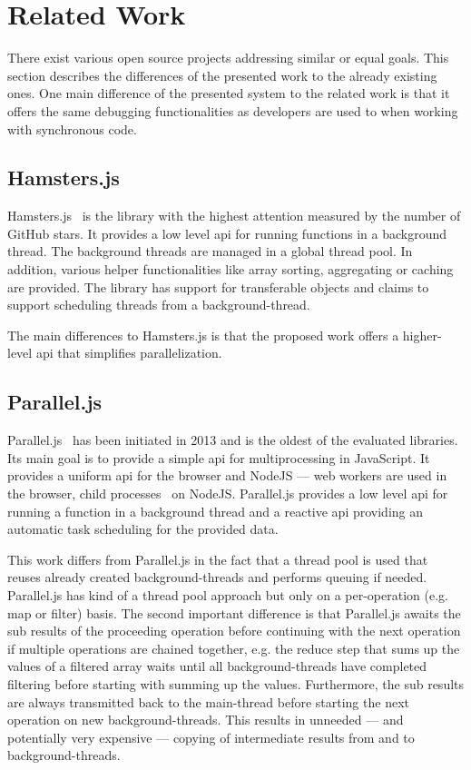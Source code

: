 \section{Related Work}\label{sec:related-work}
There exist various open source projects addressing similar or equal goals. This section describes the differences of the presented work to the already existing ones. One main difference of the presented system to the related work is that it offers the same debugging functionalities as developers are used to when working with synchronous code.

\subsection{Hamsters.js}
Hamsters.js~\cite{hamstersjs} is the library with the highest attention measured by the number of GitHub stars. It provides a low level api for running functions in a background thread. The background threads are managed in a global thread pool. In addition, various helper functionalities like array sorting, aggregating or caching are provided. The library has support for transferable objects and claims to support scheduling threads from a background-thread. 

The main differences to Hamsters.js is that the proposed work offers a higher-level api that simplifies parallelization. 

\subsection{Parallel.js}
Parallel.js~\cite{SavitzkyMayr2016} has been initiated in 2013 and is the oldest of the evaluated libraries. Its main goal is to provide a simple api for multiprocessing in JavaScript. It provides a uniform api for the browser and NodeJS --- web workers are used in the browser, child processes~\cite{childProcess} on NodeJS. Parallel.js provides a low level api for running a function in a background thread and a reactive api providing an automatic task scheduling for the provided data. 

This work differs from Parallel.js in the fact that a thread pool is used that reuses already created background-threads and performs queuing if needed. Parallel.js has kind of a thread pool approach but only on a per-operation (e.g. map or filter) basis. The second important difference is that Parallel.js awaits the sub results of the proceeding operation before continuing with the next operation if multiple operations are chained together, e.g. the reduce step that sums up the values of a filtered array waits until all background-threads have completed filtering before starting with summing up the values. Furthermore, the sub results are always transmitted back to the main-thread before starting the next operation on new background-threads. This results in unneeded --- and potentially very expensive --- copying of intermediate results from and to background-threads.


